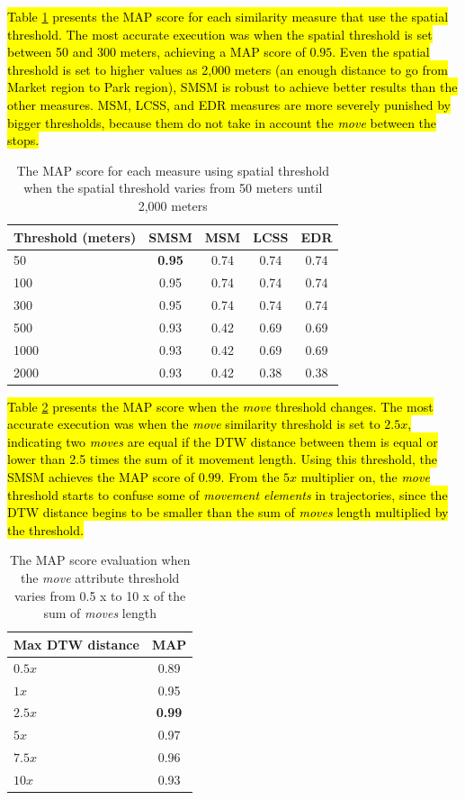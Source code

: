 \documentclass[12pt]{article}
\begin{document}
\hl{Table {\ref{tab:sensibility_spatial_thresholds}} presents the MAP score for each similarity measure that use the spatial threshold. The most accurate execution was when the spatial threshold is set between 50 and 300 meters, achieving a MAP score of $0.95$. Even the spatial threshold is set to higher values as 2,000 meters (an enough distance to go from Market region to Park region), SMSM is robust to achieve better results than the other measures. MSM, LCSS, and EDR measures are more severely punished by bigger thresholds, because them do not take in account the \emph{move} between the stops.}

\begin{table}[ht!]
  \scriptsize
  \centering
  \begin{tabular}{|l|c|c|c|c|}
  	\hline
Threshold (meters) & SMSM & MSM & LCSS & EDR\\
  	\hline
50 & \textbf{0.95} & 0.74 & 0.74 & 0.74 \\
100 & 0.95 & 0.74 & 0.74 & 0.74 \\
300 & 0.95 & 0.74 & 0.74 & 0.74 \\
500 & 0.93 & 0.42 & 0.69 & 0.69 \\
1000 & 0.93 & 0.42 & 0.69 & 0.69 \\
2000 & 0.93 & 0.42 & 0.38 & 0.38 \\
    \hline
  \end{tabular}
  \caption{The MAP score for each measure using spatial threshold when the spatial threshold varies from 50 meters until 2,000 meters}
  \label{tab:sensibility_spatial_thresholds}
\end{table}

\hl{Table {\ref{tab:sensibility_movement_thresholds}} presents the MAP score when the \emph{move} threshold changes. The most accurate execution was when the \emph{move} similarity threshold is set to $2.5 x$, indicating two \emph{moves} are equal if the DTW distance between them is equal or lower than 2.5 times the sum of it movement length. Using this threshold, the SMSM achieves the MAP score of $0.99$. From the $5 x$ multiplier on, the \emph{move} threshold starts to confuse some of \emph{movement elements} in trajectories, since the DTW distance begins to be smaller than the sum of \emph{moves} length multiplied by the threshold.}


\begin{table}[ht!]
  \scriptsize
  \centering
  \begin{tabular}{|l|c|}
  	\hline
Max DTW distance & MAP\\
  	\hline
$0.5 x$ & 0.89 \\
$1 x$ & 0.95 \\
$2.5 x$ & \textbf{0.99} \\
$5 x$ & 0.97 \\
$7.5 x$ & 0.96 \\
$10 x$ & 0.93 \\
    \hline
  \end{tabular}
  \caption{The MAP score evaluation when the \emph{move} attribute threshold varies from 0.5 x to 10 x of the sum of \emph{moves} length}
  \label{tab:sensibility_movement_thresholds}
\end{table}
\end{document}
